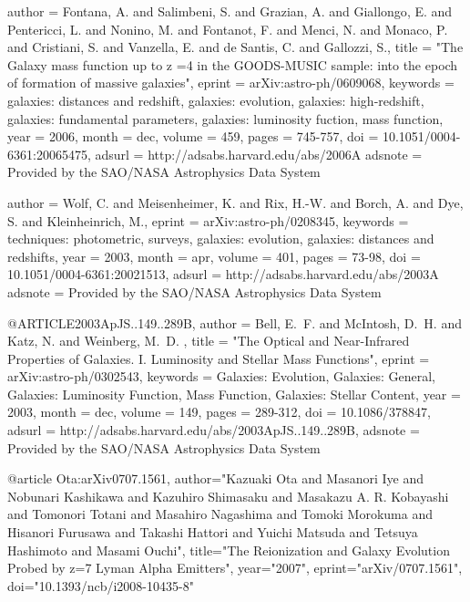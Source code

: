 \documentclass{article}
\begin{document}
   author = {{Fontana}, A. and {Salimbeni}, S. and {Grazian}, A. and {Giallongo}, E. and 
	{Pentericci}, L. and {Nonino}, M. and {Fontanot}, F. and {Menci}, N. and 
	{Monaco}, P. and {Cristiani}, S. and {Vanzella}, E. and {de Santis}, C. and 
	{Gallozzi}, S.},
    title = "{The Galaxy mass function up to z =4 in the GOODS-MUSIC sample: into the epoch of formation of massive galaxies}",
   eprint = {arXiv:astro-ph/0609068},
 keywords = {galaxies: distances and redshift, galaxies: evolution, galaxies: high-redshift, galaxies: fundamental parameters, galaxies: luminosity fuction, mass function},
     year = 2006,
    month = dec,
   volume = 459,
    pages = {745-757},
      doi = {10.1051/0004-6361:20065475},
   adsurl = {http://adsabs.harvard.edu/abs/2006A%
  adsnote = {Provided by the SAO/NASA Astrophysics Data System}
}

   author = {{Wolf}, C. and {Meisenheimer}, K. and {Rix}, H.-W. and {Borch}, A. and 
	{Dye}, S. and {Kleinheinrich}, M.},
   eprint = {arXiv:astro-ph/0208345},
 keywords = {techniques: photometric, surveys, galaxies: evolution, galaxies: distances and redshifts},
     year = 2003,
    month = apr,
   volume = 401,
    pages = {73-98},
      doi = {10.1051/0004-6361:20021513},
   adsurl = {http://adsabs.harvard.edu/abs/2003A%
  adsnote = {Provided by the SAO/NASA Astrophysics Data System}
}

@ARTICLE{2003ApJS..149..289B,
   author = {{Bell}, E.~F. and {McIntosh}, D.~H. and {Katz}, N. and {Weinberg}, M.~D.
	},
    title = "{The Optical and Near-Infrared Properties of Galaxies. I. Luminosity and Stellar Mass Functions}",
   eprint = {arXiv:astro-ph/0302543},
 keywords = {Galaxies: Evolution, Galaxies: General, Galaxies: Luminosity Function, Mass Function, Galaxies: Stellar Content},
     year = 2003,
    month = dec,
   volume = 149,
    pages = {289-312},
      doi = {10.1086/378847},
   adsurl = {http://adsabs.harvard.edu/abs/2003ApJS..149..289B},
  adsnote = {Provided by the SAO/NASA Astrophysics Data System}
}

@article {Ota:arXiv0707.1561,
author="Kazuaki Ota and Masanori Iye and Nobunari Kashikawa and Kazuhiro Shimasaku and Masakazu A. R. Kobayashi and Tomonori Totani and Masahiro Nagashima and Tomoki Morokuma and Hisanori Furusawa and Takashi Hattori and Yuichi Matsuda and Tetsuya Hashimoto and Masami Ouchi",
title="The Reionization and Galaxy Evolution Probed by z=7 Lyman Alpha Emitters",
year="2007",
eprint="arXiv/0707.1561",
doi="10.1393/ncb/i2008-10435-8"
} 
\end{document}
